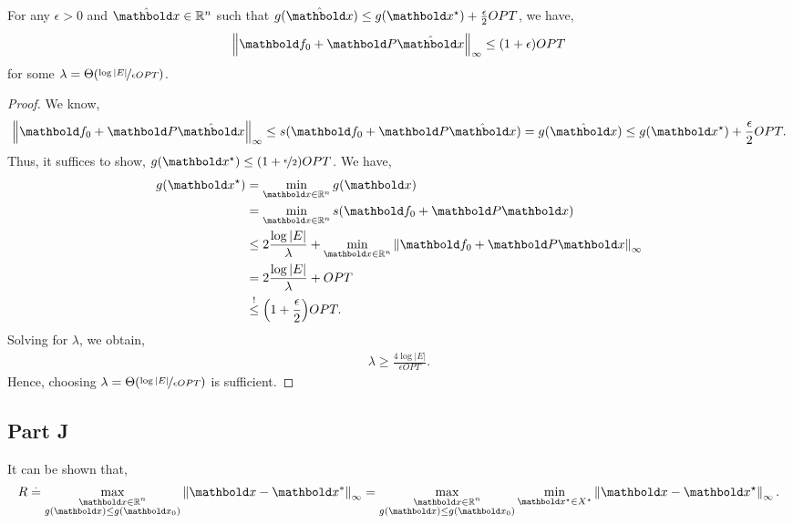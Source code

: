 \documentclass{tufte-handout}
\begin{document}
\begin{lem}\label{lem:part:2i:2}
For any $\epsilon > 0$ and $\hat{\vx} \in \R^n$ such that $g(\hat{\vx}) \leq g(\vx^\star) + \frac{\epsilon}{2}OPT$, we have, \begin{align*}
    \norm{\vf_0 + \mP\hat{\vx}}_\infty \leq (1+\epsilon)OPT
\end{align*} for some $\lambda = \LandauTheta{\nicefrac{\log |E|}{\epsilon OPT}}$.
\end{lem}
\begin{proof} We know, \begin{align*}
    \norm{\vf_0 + \mP\hat{\vx}}_\infty \leq s(\vf_0 + \mP\hat{\vx}) = g(\hat{\vx}) \leq g(\vx^\star) + \frac{\epsilon}{2}OPT.
\end{align*} Thus, it suffices to show, $g(\vx^\star) \leq (1 + \nicefrac{\epsilon}{2})OPT$. We have, \begin{align*}
    g(\vx^\star) &= \min_{\vx\in\R^n} g(\vx) \\
    &= \min_{\vx\in\R^n} s(\vf_0 + \mP\vx) \\
    &\leq 2\frac{\log |E|}{\lambda} + \min_{\vx\in\R^n} \norm{\vf_0 + \mP\vx}_\infty \\
    &= 2\frac{\log |E|}{\lambda} + OPT \\
    &\overset{!}{\leq} \parentheses*{1 + \frac{\epsilon}{2}}OPT.
\end{align*} Solving for $\lambda$, we obtain, \begin{align*}
    \lambda \geq \frac{4 \log |E|}{\epsilon OPT}.
\end{align*} Hence, choosing $\lambda = \LandauTheta{\nicefrac{\log |E|}{\epsilon OPT}}$ is sufficient.
\end{proof}

\subsection{Part J}
It can be shown that, \begin{align}
    R \defeq \max_{\substack{\vx \in \R^n \\ g(\vx) \leq g(\vx_0)}} \norm{\vx - \s{\vx}}_\infty = \max_{\substack{\vx \in \R^n \\ g(\vx) \leq g(\vx_0)}} \min_{\vx^\star \in \sX^\star} \norm{\vx - \vx^\star}_\infty.
\end{align}
\end{document}
